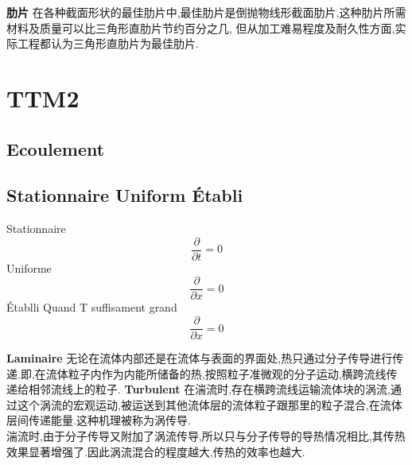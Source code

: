 \documentclass{article}
\begin{document}
\textbf{肋片}
在各种截面形状的最佳肋片中,最佳肋片是倒抛物线形截面肋片,这种肋片所需材料及质量可以比三角形直肋片节约百分之几,
但从加工难易程度及耐久性方面,实际工程都认为三角形直肋片为最佳肋片.

\section{TTM2}
\subsection{Ecoulement}
\subsection{Stationnaire Uniform \'Etabli}
Stationnaire
$$ \frac{\partial  }{\partial t}=0 $$
Uniforme
$$ \frac{\partial  }{\partial x}=0 $$
\'Etablli
Quand T suffisament grand
$$ \frac{\partial  }{\partial x}=0 $$

\textbf{Laminaire}
无论在流体内部还是在流体与表面的界面处,热只通过分子传导进行传递.即,在流体粒子内作为内能所储备的热,按照粒子准微观的分子运动,横跨流线传递给相邻流线上的粒子.
\textbf{Turbulent}
在湍流时,存在横跨流线运输流体块的涡流,通过这个涡流的宏观运动,被运送到其他流体层的流体粒子跟那里的粒子混合,在流体层间传递能量.这种机理被称为涡传导.\\
湍流时,由于分子传导又附加了涡流传导,所以只与分子传导的导热情况相比,其传热效果显著增强了.因此涡流混合的程度越大,传热的效率也越大.
\end{document}

